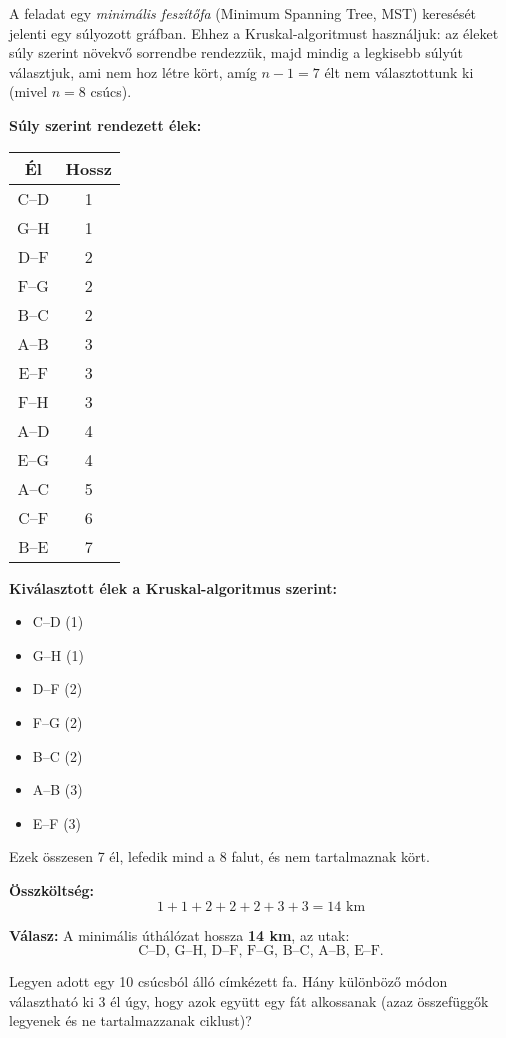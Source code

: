 \begin{solution}
	A feladat egy \emph{minimális feszítőfa} (Minimum Spanning Tree, MST)
	keresését jelenti egy súlyozott gráfban. Ehhez a Kruskal-algoritmust
	használjuk: az éleket súly szerint növekvő sorrendbe rendezzük, majd
	mindig a legkisebb súlyút választjuk, ami nem hoz létre kört, amíg
	$n-1=7$ élt nem választottunk ki (mivel $n=8$ csúcs).
	
	\textbf{Súly szerint rendezett élek:}
	
	\begin{center}
		\begin{tabular}{|c|c|}
		\hline 
		\textbf{Él} & \textbf{Hossz}\tabularnewline
		\hline 
		C--D & 1\tabularnewline
		G--H & 1\tabularnewline
		D--F & 2\tabularnewline
		F--G & 2\tabularnewline
		B--C & 2\tabularnewline
		A--B & 3\tabularnewline
		E--F & 3\tabularnewline
		F--H & 3\tabularnewline
		A--D & 4\tabularnewline
		E--G & 4\tabularnewline
		A--C & 5\tabularnewline
		C--F & 6\tabularnewline
		B--E & 7\tabularnewline
		\hline 
	\end{tabular}
	\end{center}
	
	\vspace{0.5em}
	\textbf{Kiválasztott élek a Kruskal-algoritmus szerint:}
	\begin{itemize}
		\item C--D (1) 
		\item G--H (1) 
		\item D--F (2) 
		\item F--G (2) 
		\item B--C (2) 
		\item A--B (3) 
		\item E--F (3) 
	\end{itemize}
	Ezek összesen 7 él, lefedik mind a 8 falut, és nem tartalmaznak kört.
	
	\vspace{0.5em}
	\textbf{Összköltség:} 
	\[
	1+1+2+2+2+3+3=\boxed{14\text{ km}}
	\]
	
	\vspace{0.5em}
	\textbf{Válasz:} A minimális úthálózat hossza \textbf{14 km}, az
	utak: 
	\[
	\text{C--D, G--H, D--F, F--G, B--C, A--B, E--F}.
	\]
\end{solution}
\begin{extraproblem}
	Legyen adott egy 10 csúcsból álló címkézett fa. Hány különböző módon
	választható ki 3 él úgy, hogy azok együtt egy fát alkossanak (azaz
	összefüggők legyenek és ne tartalmazzanak ciklust)? 
\end{extraproblem}

